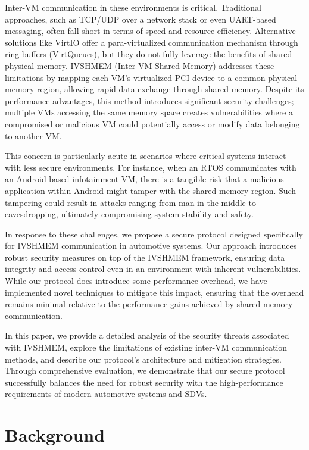 \documentclass[conference]{IEEEtran}
\begin{document}
Inter-VM communication in these environments is critical. Traditional
approaches, such as TCP/UDP over a network stack or even UART-based messaging,
often fall short in terms of speed and resource efficiency. Alternative
solutions like VirtIO offer a para-virtualized communication mechanism through
ring buffers (VirtQueues), but they do not fully leverage the benefits of
shared physical memory. IVSHMEM (Inter-VM Shared Memory) addresses these
limitations by mapping each VM's virtualized PCI device to a common physical
memory region, allowing rapid data exchange through shared memory. Despite its
performance advantages, this method introduces significant security challenges;
multiple VMs accessing the same memory space creates vulnerabilities where a
compromised or malicious VM could potentially access or modify data belonging
to another VM.

This concern is particularly acute in scenarios where critical systems interact
with less secure environments. For instance, when an RTOS communicates with an
Android-based infotainment VM, there is a tangible risk that a malicious
application within Android might tamper with the shared memory region. Such
tampering could result in attacks ranging from man-in-the-middle to
eavesdropping, ultimately compromising system stability and safety.

In response to these challenges, we propose a secure protocol designed
specifically for IVSHMEM communication in automotive systems. Our approach
introduces robust security measures on top of the IVSHMEM framework, ensuring
data integrity and access control even in an environment with inherent
vulnerabilities. While our protocol does introduce some performance overhead,
we have implemented novel techniques to mitigate this impact, ensuring that the
overhead remains minimal relative to the performance gains achieved by shared
memory communication.

In this paper, we provide a detailed analysis of the security threats
associated with IVSHMEM, explore the limitations of existing inter-VM
communication methods, and describe our protocol's architecture and mitigation
strategies. Through comprehensive evaluation, we demonstrate that our secure
protocol successfully balances the need for robust security with the
high-performance requirements of modern automotive systems and SDVs.

\section{Background}
\end{document}
